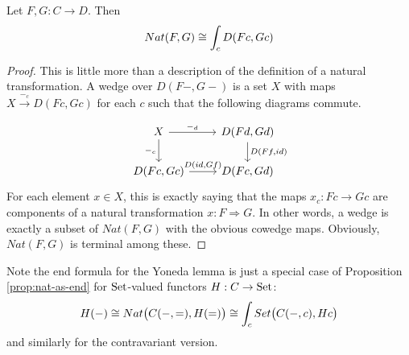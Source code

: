 \begin{prop}\label{prop:nat-as-end}

Let $F,G:C\rightarrow D$. Then $$Nat(F,G)\cong \int_c D(Fc,Gc)$$
\end{prop}
\begin{proof}
    This is little more than a description of the definition of a natural transformation. A wedge over $D(F-,G-)$ is a set $X$ with maps $X\xrightarrow[]{-_c}D(Fc,Gc)$ for each $c$ such that the following diagrams commute.
\[\begin{tikzcd}
X \arrow[r, "-_d"] \arrow[d, "-_c"'] & {D(Fd,Gd)} \arrow[d, "{D(Ff,id)}"] \\
{D(Fc,Gc)} \arrow[r, "{D(id,Gf)}"]   & {D(Fc,Gd)}                        
\end{tikzcd}\]
For each element $x\in X$, this is exactly saying that the maps $x_c:Fc\rightarrow Gc$ are components of a natural transformation $x:F\Rightarrow G$. In other words, a wedge is exactly a subset of $Nat(F,G)$ with the obvious cowedge maps. Obviously, $Nat(F,G)$ is terminal among these.
\end{proof}
\begin{remark}
    Note the end formula for the Yoneda lemma is just a special case of Proposition \ref{prop:nat-as-end} for ${\text{Set}}$-valued functors $H:C\rightarrow {\text{Set}}$:
    $$H(-)\cong Nat\big(C(-,=),H(=)\big)\cong \int_c Set\big(C(-,c),Hc\big)$$
    and similarly for the contravariant version.
\end{remark}

